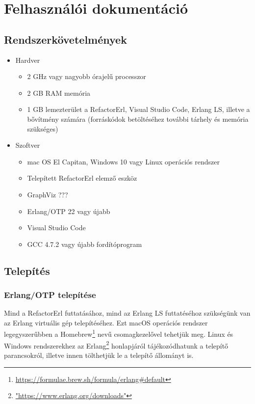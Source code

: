\chapter{Felhasználói dokumentáció}
\label{ch:user}

\section{Rendszerkövetelmények}

\begin{itemize}
    \item Hardver
    \begin{itemize}
        \item 2 GHz vagy nagyobb órajelű processzor
        \item 2 GB RAM memória
        \item 1 GB lemezterület a RefactorErl, Visual Studio Code, Erlang LS, illetve a bővítmény számára (forráskódok betöltéséhez további tárhely és memória szükséges)
    \end{itemize}
    \item Szoftver
    \begin{itemize}
        \item mac OS El Capitan, Windows 10 vagy Linux operációs rendszer
        \item Telepített RefactorErl elemző eszköz
        \item GraphViz ??? 
        \item Erlang/OTP 22 vagy újabb 
        \item Visual Studio Code 
        \item GCC 4.7.2 vagy újabb fordítóprogram
    \end{itemize}
\end{itemize}

\section{Telepítés}
\subsection{Erlang/OTP telepítése}

Mind a RefactorErl futtatásához, mind az Erlang LS futtatéséhoz szükségünk van az Erlang virtuális gép telepítéséhez. Ezt macOS operációs rendszer legegyszerűbben a Homebrew\footnote{\url{https://formulae.brew.sh/formula/erlang\#default}} nevű csomagkezelővel tehetjük meg. Linux és Windows rendszerekhez az Erlang\footnote{\url{"https://www.erlang.org/downloads"}} honlapjáról tájékozódhatunk a telepítő parancsokról, illetve innen tölthetjük le a telepítő állományt is.

